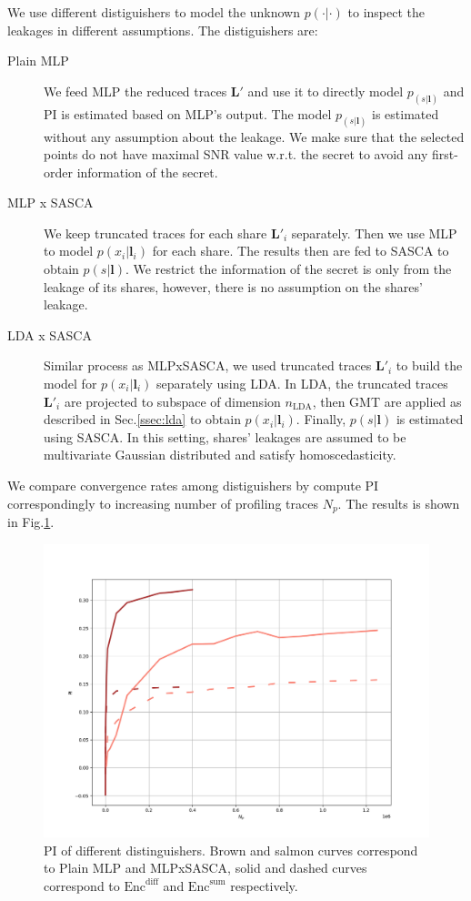 \documentclass{llncs}
\begin{document}
We use different distiguishers to model the unknown $p(\cdot|\cdot)$ to inspect the leakages in different assumptions. 
The distiguishers are:
\begin{description}
	\item[Plain MLP] We feed MLP the reduced traces $\bm{L}'$ and use it to directly model $p_(s|\bm{l})$ and PI is estimated based on MLP's output. The model $p_(s|\bm{l})$ is estimated without any assumption about the leakage. We make sure that the selected points do not have maximal SNR value w.r.t. the secret to avoid any first-order information of the secret.
	\item[MLP x SASCA] We keep truncated traces for each share $\bm{L}'_i$ separately. Then we use MLP to model $p(x_i|\bm{l}_i)$ for each share. The results then are fed to SASCA to obtain $p(s|\bm{l})$. We restrict the information of the secret is only from the leakage of its shares, however, there is no assumption on the shares' leakage.
	\item[LDA x SASCA] Similar process as MLPxSASCA, we used truncated traces $\bm{L}'_i$  to build the model for $p(x_i|\bm{l}_i)$ separately using LDA. In LDA, the truncated traces  $\bm{L}'_i$  are projected to subspace of dimension $n_{\text{LDA}}$, then GMT are applied as described in Sec.\ref{ssec:lda} to obtain  $p(x_i|\bm{l}_i)$. Finally, $p(s|\bm{l})$ is estimated using SASCA. In this setting, shares' leakages are assumed to be multivariate Gaussian distributed and satisfy homoscedasticity.
\end{description}
We compare convergence rates among distiguishers by compute PI correspondingly to increasing number of profiling traces $N_p$. The results is shown in Fig.\ref{fig:pi}.
\begin{figure}[h]
	\vspace*{-0.0cm}
	\hspace*{0.0cm}\centering \includegraphics[scale=0.3]{figures/pi_mlps.png}
	\vspace*{0.3cm}
	\caption{PI of different distinguishers. Brown and salmon curves correspond to Plain MLP and MLPxSASCA, solid and dashed curves correspond to $\text{Enc}^{\text{diff}}$ and $\text{Enc}^{\text{sum}}$  respectively.}
	\label{fig:pi}
\end{figure}
\end{document}
